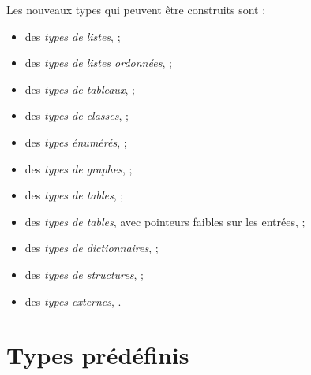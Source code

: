 
Les nouveaux types qui peuvent être construits sont :
\begin{itemize}
  \item des \emph{types de listes},  ;
  \item des \emph{types de listes ordonnées},  ;
  \item des \emph{types de tableaux},  ;
  \item des \emph{types de classes},  ;
  \item des \emph{types énumérés},  ;
  \item des \emph{types de graphes},  ;
  \item des \emph{types de tables},  ;
  \item des \emph{types de tables}, avec pointeurs faibles sur les entrées,  ;
  \item des \emph{types de dictionnaires},  ;
  \item des \emph{types de structures},  ;
  \item des \emph{types externes}, .
\end{itemize}









\section{Types prédéfinis}

